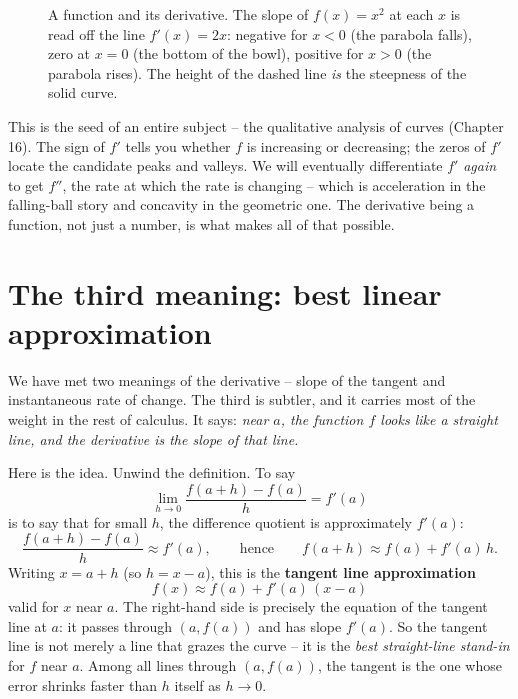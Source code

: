 \begin{figure}[h]
\centering
{}
\caption{A function and its derivative. The slope of $f(x)=x^2$ at each $x$ is
read off the line $f'(x)=2x$: negative for $x<0$ (the parabola falls), zero at
$x=0$ (the bottom of the bowl), positive for $x>0$ (the parabola rises). The
height of the dashed line \emph{is} the steepness of the solid curve.}
\label{ch10:fig-f-and-fprime}
\end{figure}

\begin{connectionbox}
This is the seed of an entire subject -- the qualitative analysis of curves
(Chapter 16). The sign of $f'$ tells you whether $f$ is increasing or decreasing;
the zeros of $f'$ locate the candidate peaks and valleys. We will eventually
differentiate $f'$ \emph{again} to get $f''$, the rate at which the rate is
changing -- which is acceleration in the falling-ball story and concavity in the
geometric one. The derivative being a function, not just a number, is what makes
all of that possible.
\end{connectionbox}

\section{The third meaning: best linear approximation}
\label{ch10:best-linear}

We have met two meanings of the derivative -- slope of the tangent and
instantaneous rate of change. The third is subtler, and it carries most of the
weight in the rest of calculus. It says: \emph{near $a$, the function $f$ looks
like a straight line, and the derivative is the slope of that line.}

Here is the idea. Unwind the definition. To say
\[
  \lim_{h \to 0} \frac{f(a + h) - f(a)}{h} = f'(a)
\]
is to say that for small $h$, the difference quotient is approximately $f'(a)$:
\[
  \frac{f(a + h) - f(a)}{h} \approx f'(a),
  \qquad\text{hence}\qquad
  f(a + h) \approx f(a) + f'(a)\,h.
\]
Writing $x = a + h$ (so $h = x - a$), this is the \textbf{tangent line
approximation}
\[
  \boxed{\,f(x) \approx f(a) + f'(a)\,(x - a)\,}
\]
valid for $x$ near $a$. The right-hand side is precisely the equation of the
tangent line at $a$: it passes through $(a, f(a))$ and has slope $f'(a)$. So the
tangent line is not merely a line that grazes the curve -- it is the \emph{best
straight-line stand-in} for $f$ near $a$. Among all lines through $(a, f(a))$, the
tangent is the one whose error shrinks faster than $h$ itself as $h \to 0$.

